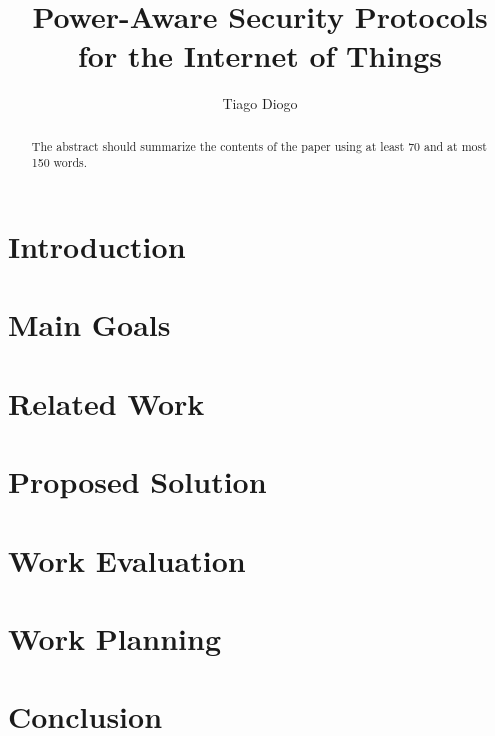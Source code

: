 \documentclass{llncs}
\begin{document}
\setcounter{secnumdepth}{3}

\title{Power-Aware Security Protocols for the Internet of Things}
%
\titlerunning{}  %
%
\author{Tiago Diogo}
%
%
%

\maketitle              %

\begin{abstract}
The abstract should summarize the contents of the paper
using at least 70 and at most 150 words.
\keywords{}
\end{abstract}

\section{Introduction}


\section{Main Goals}


\section{Related Work}


\section{Proposed Solution}


\section{Work Evaluation}


\section{Work Planning}


\section{Conclusion}


%




\end{document}
